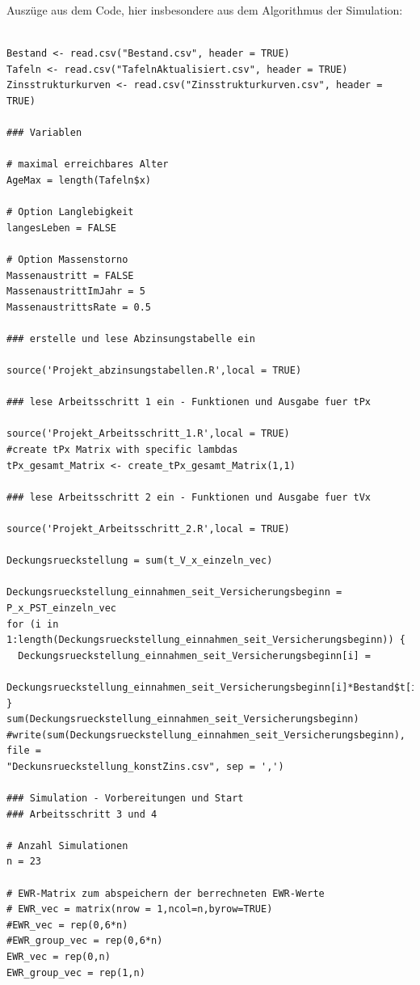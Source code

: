 \documentclass[parskip,12pt,paper=a4]{scrartcl}
\begin{document}
Auszüge aus dem Code, hier insbesondere aus dem Algorithmus der Simulation:
\begin{tiny}
\begin{mdframed}
\begin{lstlisting}

Bestand <- read.csv("Bestand.csv", header = TRUE)
Tafeln <- read.csv("TafelnAktualisiert.csv", header = TRUE)
Zinsstrukturkurven <- read.csv("Zinsstrukturkurven.csv", header = TRUE)

### Variablen

# maximal erreichbares Alter
AgeMax = length(Tafeln$x)

# Option Langlebigkeit
langesLeben = FALSE

# Option Massenstorno
Massenaustritt = FALSE
MassenaustrittImJahr = 5
MassenaustrittsRate = 0.5

### erstelle und lese Abzinsungstabelle ein

source('Projekt_abzinsungstabellen.R',local = TRUE)

### lese Arbeitsschritt 1 ein - Funktionen und Ausgabe fuer tPx

source('Projekt_Arbeitsschritt_1.R',local = TRUE)
#create tPx Matrix with specific lambdas
tPx_gesamt_Matrix <- create_tPx_gesamt_Matrix(1,1)

### lese Arbeitsschritt 2 ein - Funktionen und Ausgabe fuer tVx

source('Projekt_Arbeitsschritt_2.R',local = TRUE)

Deckungsrueckstellung = sum(t_V_x_einzeln_vec)

Deckungsrueckstellung_einnahmen_seit_Versicherungsbeginn = P_x_PST_einzeln_vec
for (i in 1:length(Deckungsrueckstellung_einnahmen_seit_Versicherungsbeginn)) {
  Deckungsrueckstellung_einnahmen_seit_Versicherungsbeginn[i] =
 Deckungsrueckstellung_einnahmen_seit_Versicherungsbeginn[i]*Bestand$t[i]
}
sum(Deckungsrueckstellung_einnahmen_seit_Versicherungsbeginn)
#write(sum(Deckungsrueckstellung_einnahmen_seit_Versicherungsbeginn), file = 
"Deckunsrueckstellung_konstZins.csv", sep = ',')

### Simulation - Vorbereitungen und Start
### Arbeitsschritt 3 und 4

# Anzahl Simulationen
n = 23

# EWR-Matrix zum abspeichern der berrechneten EWR-Werte
# EWR_vec = matrix(nrow = 1,ncol=n,byrow=TRUE)
#EWR_vec = rep(0,6*n)
#EWR_group_vec = rep(0,6*n)
EWR_vec = rep(0,n)
EWR_group_vec = rep(1,n)



\end{lstlisting}
\end{mdframed}
\end{tiny}
\end{document}

